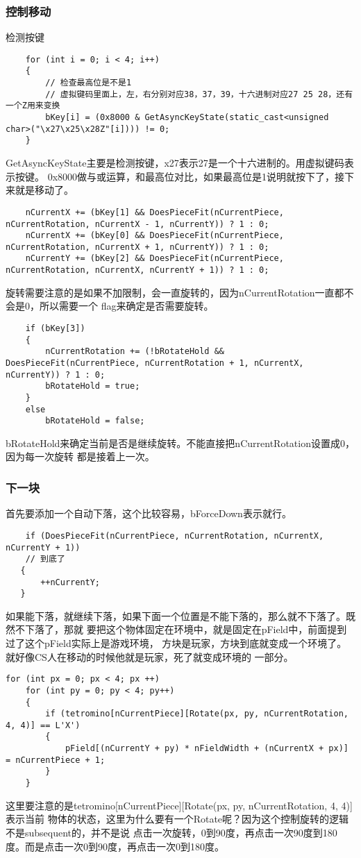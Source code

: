 \documentclass{article}
\begin{document}
\begin{sloppypar}
\subsubsection{控制移动}
检测按键
\begin{lstlisting}
	for (int i = 0; i < 4; i++)
	{   
		// 检查最高位是不是1
		// 虚拟键码里面上，左，右分别对应38，37，39，十六进制对应27 25 28，还有一个Z用来变换
		bKey[i] = (0x8000 & GetAsyncKeyState(static_cast<unsigned char>("\x27\x25\x28Z"[i]))) != 0;
	}
\end{lstlisting}
GetAsyncKeyState主要是检测按键，x27表示27是一个十六进制的。用虚拟键码表示按键。
0x8000做与或运算，和最高位对比，如果最高位是1说明就按下了，接下来就是移动了。
\begin{lstlisting}
	nCurrentX += (bKey[1] && DoesPieceFit(nCurrentPiece, nCurrentRotation, nCurrentX - 1, nCurrentY)) ? 1 : 0;
	nCurrentX += (bKey[0] && DoesPieceFit(nCurrentPiece, nCurrentRotation, nCurrentX + 1, nCurrentY)) ? 1 : 0;
	nCurrentY += (bKey[2] && DoesPieceFit(nCurrentPiece, nCurrentRotation, nCurrentX, nCurrentY + 1)) ? 1 : 0;
\end{lstlisting}
旋转需要注意的是如果不加限制，会一直旋转的，因为nCurrentRotation一直都不会是0，所以需要一个
flag来确定是否需要旋转。
\begin{lstlisting}
	if (bKey[3])
	{
		nCurrentRotation += (!bRotateHold && DoesPieceFit(nCurrentPiece, nCurrentRotation + 1, nCurrentX, nCurrentY)) ? 1 : 0;
		bRotateHold = true;
	}
	else
		bRotateHold = false;
\end{lstlisting}
bRotateHold来确定当前是否是继续旋转。不能直接把nCurrentRotation设置成0，因为每一次旋转
都是接着上一次。

\subsubsection{下一块}
首先要添加一个自动下落，这个比较容易，bForceDown表示就行。
\begin{lstlisting}
	if (DoesPieceFit(nCurrentPiece, nCurrentRotation, nCurrentX, nCurrentY + 1))
	// 到底了
   {
	   ++nCurrentY;
   }
\end{lstlisting}
如果能下落，就继续下落，如果下面一个位置是不能下落的，那么就不下落了。既然不下落了，那就
要把这个物体固定在环境中，就是固定在pField中，前面提到过了这个pField实际上是游戏环境，
方块是玩家，方块到底就变成一个环境了。就好像CS人在移动的时候他就是玩家，死了就变成环境的
一部分。
\begin{lstlisting}
for (int px = 0; px < 4; px ++)
	for (int py = 0; py < 4; py++)
	{
		if (tetromino[nCurrentPiece][Rotate(px, py, nCurrentRotation, 4, 4)] == L'X')
		{
			pField[(nCurrentY + py) * nFieldWidth + (nCurrentX + px)] = nCurrentPiece + 1;
		}
	}
\end{lstlisting}
这里要注意的是tetromino[nCurrentPiece][Rotate(px, py, nCurrentRotation, 4, 4)]表示当前
物体的状态，这里为什么要有一个Rotate呢？因为这个控制旋转的逻辑不是subsequent的，并不是说
点击一次旋转，0到90度，再点击一次90度到180度。而是点击一次0到90度，再点击一次0到180度。


\end{sloppypar}
\end{document}
